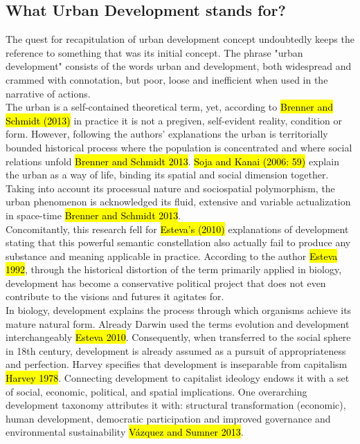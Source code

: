 \documentclass[11pt]{report}
\begin{document}
\subsection{What Urban Development stands for?}

The quest for recapitulation of urban development concept undoubtedly keeps the reference to something that was its initial concept.
The phrase "urban development" consists of the words urban and development, both widespread and crammed with connotation, but poor, loose and inefficient when used in the narrative of actions.
\\
The urban is a self-contained theoretical term, yet, according to \hl{Brenner and Schmidt (2013)} in practice it is not a pregiven, self-evident reality, condition or form. 
However, following the authors' explanations the urban is territorially bounded historical process where the population is concentrated and where social relations unfold \hl{Brenner and Schmidt 2013}.
\hl{Soja and Kanai (2006: 59)} explain the urban as a way of life, binding its spatial and social dimension together.
Taking into account its processual nature and sociospatial polymorphism, the urban phenomenon is acknowledged its fluid, extensive and variable actualization in space-time \hl{Brenner and Schmidt 2013}.
\\
Concomitantly, this research fell for \hl{Esteva's (2010)} explanations of development stating that this powerful semantic constellation also actually fail to produce any substance and meaning applicable in practice.
According to the author \hl{Esteva 1992}, through the historical distortion of the term primarily applied in biology, development has become a conservative political project that does not even contribute to the visions and futures it agitates for. 
\\
In biology, development explains the process through which organisms achieve its mature natural form. Already Darwin used the terms evolution and development interchangeably \hl{Esteva 2010}.
Consequently, when transferred to the social sphere in 18th century, development is already assumed as a pursuit of appropriateness and perfection.
Harvey specifies that development is inseparable from capitalism \hl{Harvey 1978}.
Connecting development to capitalist ideology endows it with a set of social, economic, political, and spatial implications.
One overarching development taxonomy attributes it with: structural transformation (economic), human development, democratic participation and improved governance and environmental sustainability \hl{Vázquez and Sumner 2013}.
\end{document}
